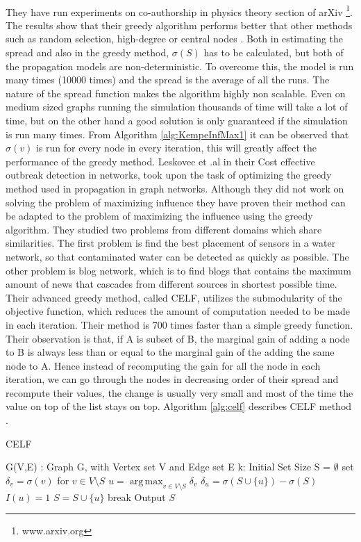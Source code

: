 \documentclass[english]{tktltiki}
\DeclareMathOperator*{\argmax}{arg\,max}
\begin{document}
\\
They have run experiments on co-authorship in physics theory section of arXiv \footnote{www.arxiv.org}. The results show that their greedy algorithm performs better that other methods such as random selection, high-degree or central nodes .
Both in estimating the spread and also in the greedy method, $\sigma (S)$ has to be calculated, but both of the propagation models are non-deterministic. To overcome this, the model is run many times (10000 times) and the spread is the average of all the runs. The nature of the spread function makes the algorithm highly non scalable. Even on medium sized graphs running the simulation thousands of time will take a lot of time, but on the other hand a good solution is only guaranteed if the simulation is run many times. From Algorithm \ref{alg:KempeInfMax1} it can be observed that $\sigma(v)$ is run for every node in every iteration, this will greatly affect the performance of the greedy method.
Leskovec et .al \cite{leskovec07}  in their Cost effective outbreak detection in networks, took upon the task of optimizing the greedy method used in propagation in graph networks. Although they did not work on solving the problem of maximizing influence they have proven their method can be adapted to the problem of maximizing the influence using the greedy algorithm. They studied two problems from different domains which share similarities. The first problem is find the best placement of sensors in a water network, so that contaminated water can be detected as quickly as possible. The other problem is blog network, which is to find blogs that contains the maximum amount of news that cascades from different sources in shortest possible time. Their advanced greedy method, called CELF, utilizes the submodularity of the objective function, which reduces the amount of computation needed to be made in each iteration. Their method is 700 times faster than a simple greedy function. 
Their observation is that, if A is subset of B, the marginal gain of adding a node to B is always less than or equal to the marginal gain of the adding the same node to A. Hence instead of recomputing the gain for all the node in each iteration, we can go through the nodes in decreasing order of their spread and recompute their values, the change is usually very small and most of the time the value on top of the list stays on top. Algorithm \ref{alg:celf} describes CELF method .
\begin{algorithm}[ht!]
\caption{CELF}
\label{alg:celf}
\begin{algorithmic}
\Require G(V,E) : Graph G, with Vertex set V and Edge set E
\Require k: Initial Set Size
\State S = $\emptyset$
	\State set $\delta_v = \sigma(v)$ for $v \in V \setminus S$
		\State $u =  \argmax_{v \in V \setminus S}\delta_v$ 
			\State $\delta_u = \sigma( S \cup \{u\}) - \sigma(S)$
			\State $I(u)=1$
		\EndIf
			\State $S = S \cup \{u\}$
			\State break
		\EndIf
	\EndWhile 
\EndFor
\State Output $S$
\end{algorithmic}
\end{algorithm}
\end{document}
